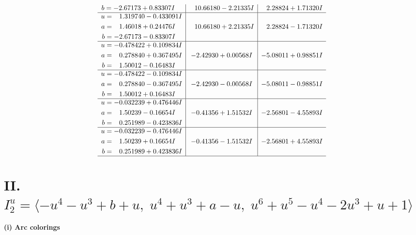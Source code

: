 \documentclass[1p]{elsarticle_modified}
\theoremstyle{definition}
\begin{document}
$$\begin{array}{c|c|c}
\begin{aligned}
b &= -2.67173 + 0.83307 I\end{aligned}
 & \phantom{-}10.66180 - 2.21335 I & \phantom{-}2.28824 + 1.71320 I \\ \hline\begin{aligned}
u &= \phantom{-}1.319740 - 0.433091 I \\
a &= \phantom{-}1.46018 + 0.24476 I \\
b &= -2.67173 - 0.83307 I\end{aligned}
 & \phantom{-}10.66180 + 2.21335 I & \phantom{-}2.28824 - 1.71320 I \\ \hline\begin{aligned}
u &= -0.478422 + 0.109834 I \\
a &= \phantom{-}0.278840 + 0.367495 I \\
b &= \phantom{-}1.50012 - 0.16483 I\end{aligned}
 & -2.42930 + 0.00568 I & -5.08011 + 0.98851 I \\ \hline\begin{aligned}
u &= -0.478422 - 0.109834 I \\
a &= \phantom{-}0.278840 - 0.367495 I \\
b &= \phantom{-}1.50012 + 0.16483 I\end{aligned}
 & -2.42930 - 0.00568 I & -5.08011 - 0.98851 I \\ \hline\begin{aligned}
u &= -0.032239 + 0.476446 I \\
a &= \phantom{-}1.50239 - 0.16654 I \\
b &= \phantom{-}0.251989 - 0.423836 I\end{aligned}
 & -0.41356 + 1.51532 I & -2.56801 - 4.55893 I \\ \hline\begin{aligned}
u &= -0.032239 - 0.476446 I \\
a &= \phantom{-}1.50239 + 0.16654 I \\
b &= \phantom{-}0.251989 + 0.423836 I\end{aligned}
 & -0.41356 - 1.51532 I & -2.56801 + 4.55893 I\\
 \hline 
 \end{array}$$\newpage\newpage\renewcommand{\arraystretch}{1}
\centering \section*{II. $I^u_{2}= \langle - u^4- u^3+b+u,\;u^4+u^3+a- u,\;u^6+u^5- u^4-2 u^3+u+1 \rangle$}
\flushleft \textbf{(i) Arc colorings}\\
\end{document}
